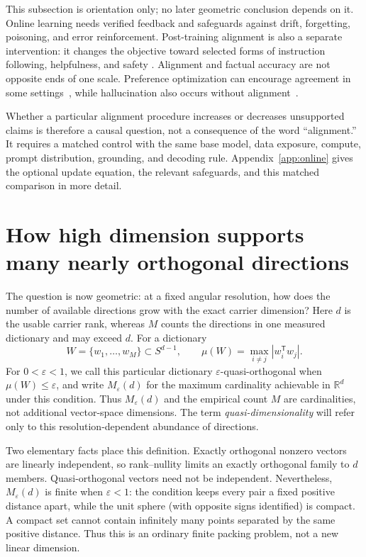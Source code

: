 \documentclass[
  aps,
  reprint,
  superscriptaddress,
  floatfix,
  nofootinbib,
  longbibliography
]{revtex4-2}
\newcommand{\R}{\mathbb{R}}
\newcommand{\Sph}[1]{S^{#1}}
\newcommand{\Msem}{M}
\newcommand{\T}{^{\mathsf{T}}}
\begin{document}
This subsection is orientation only; no later geometric conclusion depends on
it.  Online learning needs verified feedback and safeguards against drift,
forgetting, poisoning, and error reinforcement.  Post-training alignment is
also a separate intervention: it changes the objective toward selected forms
of instruction following, helpfulness, and safety
\cite{ouyang2022instructgpt}.  Alignment and factual accuracy are not opposite
ends of one scale.  Preference optimization can encourage agreement in some
settings~\cite{sharma2023sycophancy}, while hallucination also occurs without
alignment~\cite{Kalai2025Why}.

Whether a particular alignment procedure increases or decreases unsupported
claims is therefore a causal question, not a consequence of the word
``alignment.''  It requires a matched control with the same base model, data
exposure, compute, prompt distribution, grounding, and decoding rule.
Appendix~\ref{app:online} gives the optional update equation, the relevant
safeguards, and this matched comparison in more detail.

\section{How high dimension supports many nearly orthogonal directions}
\label{sec:concentration}

The question is now geometric: at a fixed angular resolution, how does the
number of available directions grow with the exact carrier dimension?  Here
$d$ is the usable carrier rank, whereas $\Msem$ counts the directions in one
measured dictionary and may exceed $d$.  For a dictionary
\begin{equation}
\label{eq:quasiortho}
W=\{w_1,\ldots,w_{\Msem}\}\subset\Sph{d-1},
\qquad
\mu(W)=\max_{i\ne j}|w_i\T w_j|.
\end{equation}
For $0<\varepsilon<1$, we call this particular dictionary
$\varepsilon$-quasi-orthogonal when $\mu(W)\leq\varepsilon$, and write
$M_\varepsilon(d)$ for the maximum cardinality achievable in $\R^d$ under
this condition.  Thus
$M_\varepsilon(d)$ and the empirical count $\Msem$ are cardinalities, not
additional vector-space dimensions.  The term \emph{quasi-dimensionality}
will refer only to this resolution-dependent abundance of directions.

Two elementary facts place this definition.  Exactly orthogonal nonzero
vectors are linearly independent, so rank--nullity limits an exactly
orthogonal family to $d$ members.  Quasi-orthogonal vectors need not be
independent.  Nevertheless, $M_\varepsilon(d)$ is finite when
$\varepsilon<1$: the condition keeps every pair a fixed positive distance
apart, while the unit sphere (with opposite signs identified) is compact.  A
compact set cannot contain infinitely many points separated by the same
positive distance.  Thus this is an ordinary finite packing problem, not a new
linear dimension.
\end{document}
